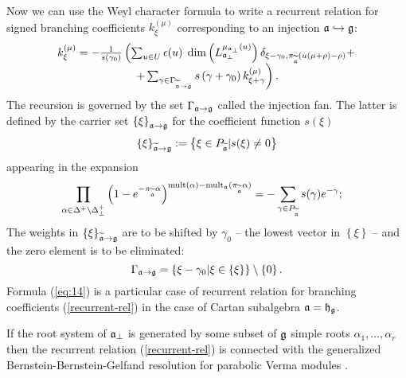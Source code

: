 Now we can use the Weyl character formula to write a
recurrent relation \cite{2010arXiv1007.0318L} for signed branching
coefficients $k_{\xi }^{\left( \mu \right) }$ corresponding to an
injection $\mathfrak{a}\hookrightarrow \mathfrak{g}$:
\begin{equation}
\begin{array}{c}
k_{\xi }^{\left( \mu \right) }=-\frac{1}{s\left( \gamma _{0}\right) }\left(
\sum_{u\in U}\epsilon (u)\;\dim \left( L_{\afb}^{\mu _{\af%
_{\perp }}\left( u\right) }\right) \delta _{\xi -\gamma _{0},\pi _{%
\widetilde{\af}}(u(\mu +\rho )-\rho )}+\right.  \\
\left. +\sum_{\gamma \in \Gamma _{\widetilde{\af}\rightarrow \gf%
}}s\left( \gamma +\gamma _{0}\right) k_{\xi +\gamma }^{\left( \mu \right)
}\right) .
\end{array}
\label{recurrent-rel}
\end{equation}
The recursion is governed by the set $\Gamma _{\mathfrak{a}\rightarrow \mathfrak{g}}$ called the injection fan. The latter is defined by the
carrier set $\left\{ \xi \right\} _{\mathfrak{a}\rightarrow \mathfrak{g}}$ for the
coefficient function $s(\xi )$
\begin{equation*}
\left\{ \xi \right\} _{\widetilde{\mathfrak{a}}\rightarrow \mathfrak{g}}:=\left\{
\xi \in P_{\widetilde{\mathfrak{a}}}|s(\xi )\neq 0\right\}
\end{equation*}
appearing in the expansion
\begin{equation}
\prod_{\alpha \in \Delta ^{+}\setminus \Delta _{\bot }^{+}}\left( 1-e^{-\pi
_{\widetilde{\af}}\alpha }\right) ^{\mathrm{mult}(\alpha )-\mathrm{mult}%
_{\af}(\pi _{\widetilde{\af}}\alpha )}=-\sum_{\gamma \in P_{%
\widetilde{\af}}}s(\gamma )e^{-\gamma };\quad
\end{equation}
The weights in $\left\{ \xi \right\} _{\widetilde{\mathfrak{a}}\rightarrow \mathfrak{g}}$ are to be shifted by $\gamma _{0}$ -- the lowest vector in $\left\{ \xi
\right\} $ -- and the zero element is to be eliminated:
\begin{equation}
\Gamma _{\mathfrak{a}\rightarrow \mathfrak{g}}=\left\{ \xi -\gamma
_{0}|\xi \in \left\{ \xi \right\} \right\} \setminus \left\{ 0\right\} .
\end{equation}
Formula (\ref{eq:14}) is a particular case of recurrent relation for branching coefficients (\ref{recurrent-rel}) in the case of Cartan subalgebra $\mathfrak{a}=\mathfrak{h}_{\mathfrak{g}}$.

If the root system of $\mathfrak{a}_{\bot}$ is generated by some subset of $\mathfrak{g}$
simple roots $\alpha_{1},\dots,\alpha_{r}$ then the recurrent
relation (\ref{recurrent-rel}) is connected with the generalized
Bernstein-Bernstein-Gelfand resolution for parabolic Verma modules
\cite{2011arXiv1102.1702L}.

